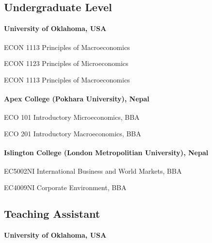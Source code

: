 \subsection{Undergraduate Level}

\paragraph{University of Oklahoma, USA}

{%
    }
{%
    ECON 1113 Principles of Macroeconomics}
{}

{%
    }
{%
    ECON 1123 Principles of Microeconomics}
{}

{%
    }
{%
    ECON 1113 Principles of Macroeconomics}
{}
\vspace{-1em}
\paragraph{Apex College (Pokhara University), Nepal}
{%
    }
{%
    ECO 101 Introductory Microeconomics, BBA}
{}

{%
    }
{%
    ECO 201 Introductory Macroeconomics, BBA}
{}
\vspace{-1em}
\paragraph{Islington College (London Metropolitian University), Nepal}

{%
    }
{%
    EC5002NI International Business and World Markets, BBA}
{}

{%
    }
{%
    EC4009NI Corporate Environment, BBA}
{}

\subsection{Teaching Assistant}
\paragraph{University of Oklahoma, USA}


